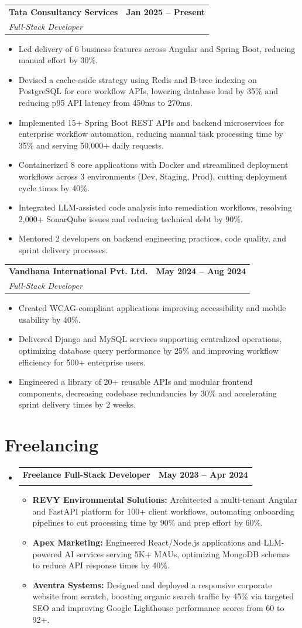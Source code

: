 \documentclass[letterpaper,11pt]{article}
\makeatletter
\newcommand{\resumeItem}[1]{\item\small{{#1 \vspace{-2pt}}}}
\newcommand{\resumeSubheading}[4]{
  \vspace{-2pt}\item
  \begin{tabular*}{1.0\textwidth}[t]{l@{\extracolsep{\fill}}r}
    \textbf{#1} & \textbf{\small #2} \\
    \textit{\small#3} & \textit{\small #4} \\
  \end{tabular*}\vspace{-7pt}
}
\newcommand{\resumeSubHeadingListStart}{\begin{itemize}[leftmargin=0.0in, label={}]}
\newcommand{\resumeSubHeadingListEnd}{\end{itemize}}
\newcommand{\resumeItemListStart}{\begin{itemize}[label=\textbullet]}
\newcommand{\resumeItemListEnd}{\end{itemize}\vspace{-5pt}}
\makeatother
\begin{document}
\resumeSubheading
{Tata Consultancy Services}{Jan 2025 -- Present}
{Full-Stack Developer}{}
\resumeItemListStart
\resumeItem{Led delivery of 6 business features across Angular and Spring Boot, reducing manual effort by 30\%.}
\resumeItem{Devised a cache-aside strategy using Redis and B-tree indexing on PostgreSQL for core workflow APIs, lowering database load by 35\% and reducing p95 API latency from 450ms to 270ms.}
\resumeItem{Implemented 15+ Spring Boot REST APIs and backend microservices for enterprise workflow automation, reducing manual task processing time by 35\% and serving 50,000+ daily requests.}
\resumeItem{Containerized 8 core applications with Docker and streamlined deployment workflows across 3 environments (Dev, Staging, Prod), cutting deployment cycle times by 40\%.}
\resumeItem{Integrated LLM-assisted code analysis into remediation workflows, resolving 2,000+ SonarQube issues and reducing technical debt by 90\%.}
\resumeItem{Mentored 2 developers on backend engineering practices, code quality, and sprint delivery processes.}
\resumeItemListEnd

\vspace{4pt}

\resumeSubheading
{Vandhana International Pvt. Ltd.}{May 2024 -- Aug 2024}
{Full-Stack Developer }{}
\resumeItemListStart
\resumeItem{Created WCAG-compliant applications improving accessibility and mobile usability by 40\%.}
\resumeItem{Delivered Django and MySQL services supporting centralized operations, optimizing database query performance by 25\% and improving workflow efficiency for 500+ enterprise users.}
\resumeItem{Engineered a library of 20+ reusable APIs and modular frontend components, decreasing codebase redundancies by 30\% and accelerating sprint delivery times by 2 weeks.}
\resumeItemListEnd
\vspace{-6pt}

\section{Freelancing}

\vspace{-4pt}
\resumeSubHeadingListStart
\resumeSubheading
{Freelance Full-Stack Developer}{May 2023 -- Apr 2024}
{}{}
\vspace{-14pt}
\resumeItemListStart
  \resumeItem{\textbf{REVY Environmental Solutions:} Architected a multi-tenant Angular and FastAPI platform for 100+ client workflows, automating onboarding pipelines to cut processing time by 90\% and prep effort by 60\%.}
  \resumeItem{\textbf{Apex Marketing:} Engineered React/Node.js applications and LLM-powered AI services serving 5K+ MAUs, optimizing MongoDB schemas to reduce API response times by 40\%.}
  \resumeItem{\textbf{Aventra Systems:} Designed and deployed a responsive corporate website from scratch, boosting organic search traffic by 45\% via targeted SEO and improving Google Lighthouse performance scores from 60 to 92+.}
\resumeItemListEnd
\resumeSubHeadingListEnd
\vspace{-12pt}
\end{document}

